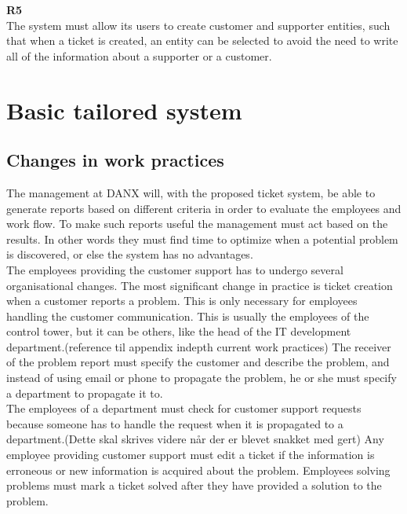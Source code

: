 \textbf{R5} \\
The system must allow its users to create customer and supporter entities, such that when a ticket is created, an entity can be selected to avoid the need to write all of the information about a supporter or a customer.

\section{Basic tailored system}
\subsection{Changes in work practices}
The management at DANX will, with the proposed ticket system, be able to generate reports based on different criteria in order to evaluate the employees and work flow. To make such reports useful the management must act based on the results. In other words they must find time to optimize when a potential problem is discovered, or else the system has no advantages.\\
The employees providing the customer support has to undergo several organisational changes. The most significant change in practice is ticket creation when a customer reports a problem. This is only necessary for employees handling the customer communication. This is usually the employees of the control tower, but it can be others, like the head of the IT development department.(reference til appendix indepth current work practices) The receiver of the problem report must specify the customer and describe the problem, and instead of using email or phone to propagate the problem, he or she must specify a department to propagate it to.\\
The employees of a department must check for customer support requests because someone has to handle the request when it is propagated to a department.(Dette skal skrives videre når der er blevet snakket med gert)
Any employee providing customer support must edit a ticket if the information is erroneous or new information is acquired about the problem. Employees solving problems must mark a ticket solved after they have provided a solution to the problem.


